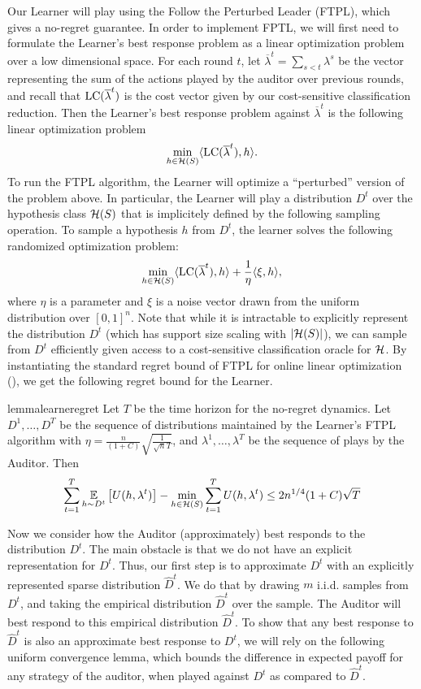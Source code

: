 Our Learner will play using the Follow the Perturbed Leader (FTPL), which gives a no-regret guarantee. In order to implement FPTL, we will first need to formulate the Learner's best
response problem as a linear optimization problem over a low dimensional space. For each round $t$,
let $\overline\lambda^t = \sum_{s < t} \lambda^s$ be the vector representing the sum of the actions played by the auditor over previous rounds, and recall that
$\mathrm{LC}(\overline \lambda^t)$ is the cost vector given by our
cost-sensitive classification reduction. Then
the Learner's best response problem against $\overline \lambda^t$ is
the following linear optimization problem
\[
  \min_{h \in \mathcal{H}(S)} \langle \mathrm{LC}(\overline\lambda^t), h \rangle.
\]
To run the FTPL algorithm, the Learner will optimize a ``perturbed''
version of the problem above. In particular, the Learner will play a
distribution $D^t$ over the hypothesis class $\mathcal{H}(S)$ that is implicitely defined by the following sampling operation. To sample a hypothesis $h$ from $D^t$, the learner solves the following randomized optimization
problem:
\begin{equation}
  \min_{h \in \mathcal{H}(S)} \langle \mathrm{LC}(\overline\lambda^t), h \rangle + \frac{1}{\eta}\langle
  \xi, h \rangle, \label{pbr-eq}
\end{equation}
where $\eta$ is a parameter and $\xi$ is a noise vector drawn from the
uniform distribution over $[0, 1]^n$. Note that while it is
intractable to explicitly represent the distribution $D^t$ (which has support size
scaling with $|\mathcal{H}(S)|$), we can sample from $D^t$ efficiently given
access to a cost-sensitive classification oracle for $\mathcal{H}$. By
instantiating the standard regret bound of FTPL for online linear
optimization (), we get the following regret
bound for the Learner.


\begin{restatable}{lemma}{learneregret}\label{learner-regret}
  Let $T$ be the time horizon for the no-regret dynamics. Let
  $D^1, \ldots, D^T$ be the sequence of distributions maintained by
  the Learner's FTPL algorithm with
  $\eta = \frac{n}{(1+C)} \sqrt{\frac{1}{\sqrt{n} T}}$, and
  $\lambda^1, \ldots, \lambda^T$ be the sequence of plays by the
  Auditor. Then
 \[
   \sum_{t= 1}^T \operatorname*{\mathbb{E}}_{h\sim D^t}\left[U(h, \lambda^t)\right] - \min_{h\in
     \mathcal{H}(S)}\sum_{t=1}^T U(h, \lambda^t) \leq 2 n^{1/4}
   {(1+C)} \sqrt{T}
  \]
\end{restatable}


Now we consider how the Auditor (approximately) best responds to the
distribution $D^t$. The main obstacle is that we do not have an
explicit representation for $D^t$. Thus, our first step is to
approximate $D^t$ with an explicitly represented sparse distribution
$\hat D^t$. We do that by drawing $m$ i.i.d. samples from $D^t$, and
taking the empirical distribution $\hat D^t$ over the sample. The
Auditor will best respond to this empirical distribution $\hat
D^t$. To show that any best response to $\hat D^t$ is also an
approximate best response to $D^t$, we will rely on the following
uniform convergence lemma, which bounds the difference in expected
payoff for any strategy of the auditor, when played against $D^t$ as
compared to $\hat D^t$.

